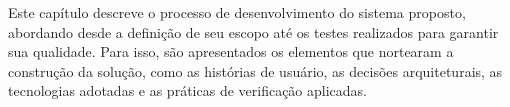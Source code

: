 
Este capítulo descreve o processo de desenvolvimento do sistema proposto, abordando desde a definição de seu escopo até os testes realizados para garantir sua qualidade. Para isso, são apresentados os elementos que nortearam a construção da solução, como as histórias de usuário, as decisões arquiteturais, as tecnologias adotadas e as práticas de verificação aplicadas.
	
	








